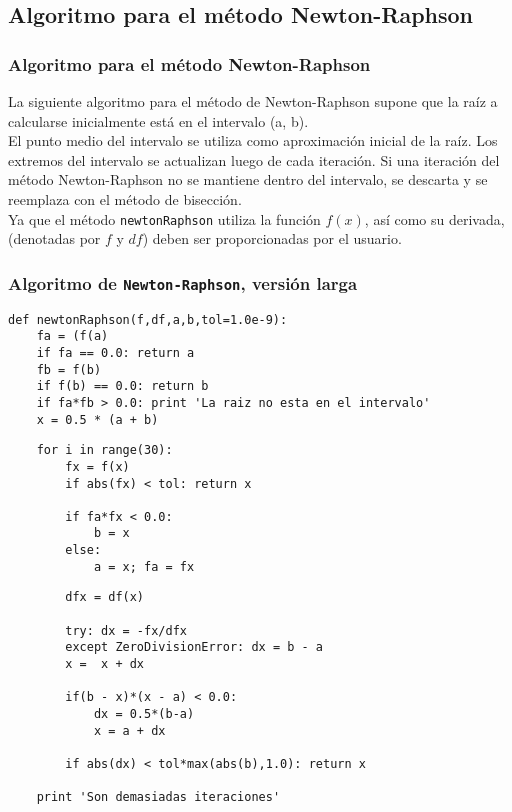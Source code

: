 \subsection{Algoritmo para el método Newton-Raphson}
\begin{frame}
\frametitle{Algoritmo para el método Newton-Raphson}
La siguiente algoritmo para el método de Newton-Raphson supone que la raíz a calcularse inicialmente está en el intervalo (a, b).
\\
\medskip
El punto medio del intervalo se utiliza como aproximación inicial de la raíz. Los extremos del intervalo se actualizan luego de cada iteración. Si una iteración del método Newton-Raphson no se mantiene dentro del intervalo, se descarta y se reemplaza
con el método de bisección.
\\
\medskip
Ya que el método \texttt{newtonRaphson} utiliza la función $f(x)$, así como su derivada, (denotadas por $f$ y $df$) deben ser proporcionadas por
el usuario.
\end{frame}
\begin{frame}[fragile]
\frametitle{Algoritmo de \texttt{Newton-Raphson}, versión larga}
\begin{lstlisting}
def newtonRaphson(f,df,a,b,tol=1.0e-9):
    fa = (f(a)
    if fa == 0.0: return a
    fb = f(b)
    if f(b) == 0.0: return b
    if fa*fb > 0.0: print 'La raiz no esta en el intervalo'
    x = 0.5 * (a + b)
\end{lstlisting}
\end{frame}
\begin{frame}[fragile]
\begin{lstlisting}
    for i in range(30):
        fx = f(x)
        if abs(fx) < tol: return x

        if fa*fx < 0.0:
            b = x
        else:
            a = x; fa = fx
\end{lstlisting}
\end{frame}
\begin{frame}[fragile]
\begin{lstlisting}
        dfx = df(x)
        
        try: dx = -fx/dfx
        except ZeroDivisionError: dx = b - a
        x =  x + dx
        
        if(b - x)*(x - a) < 0.0:
            dx = 0.5*(b-a)
            x = a + dx
        
        if abs(dx) < tol*max(abs(b),1.0): return x
    
    print 'Son demasiadas iteraciones'
\end{lstlisting}
\end{frame}
